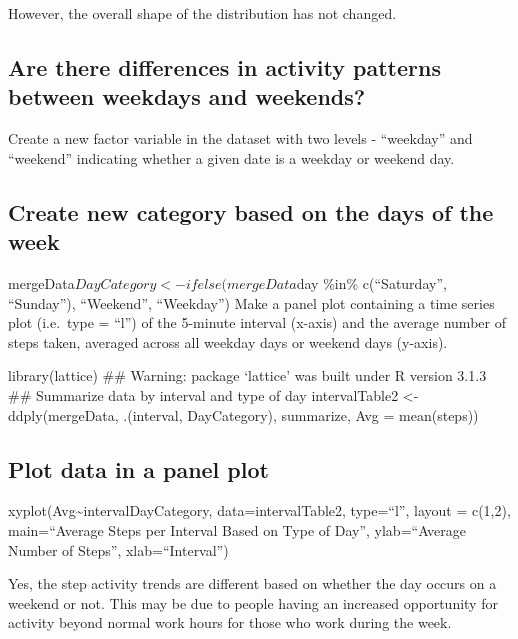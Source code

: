 \documentclass[]{article}
\begin{document}
However, the overall shape of the distribution has not changed.

\subsection{Are there differences in activity patterns between weekdays
and
weekends?}\label{are-there-differences-in-activity-patterns-between-weekdays-and-weekends}

Create a new factor variable in the dataset with two levels -
``weekday'' and ``weekend'' indicating whether a given date is a weekday
or weekend day.

\subsection{Create new category based on the days of the
week}\label{create-new-category-based-on-the-days-of-the-week}

mergeData\(DayCategory <- ifelse(mergeData\)day \%in\% c(``Saturday'',
``Sunday''), ``Weekend'', ``Weekday'') Make a panel plot containing a
time series plot (i.e.~type = ``l'') of the 5-minute interval (x-axis)
and the average number of steps taken, averaged across all weekday days
or weekend days (y-axis).

library(lattice) \#\# Warning: package `lattice' was built under R
version 3.1.3 \#\# Summarize data by interval and type of day
intervalTable2 \textless{}- ddply(mergeData, .(interval, DayCategory),
summarize, Avg = mean(steps))

\subsection{Plot data in a panel plot}\label{plot-data-in-a-panel-plot}

xyplot(Avg\textasciitilde{}interval\textbar{}DayCategory,
data=intervalTable2, type=``l'', layout = c(1,2), main=``Average Steps
per Interval Based on Type of Day'', ylab=``Average Number of Steps'',
xlab=``Interval'')

Yes, the step activity trends are different based on whether the day
occurs on a weekend or not. This may be due to people having an
increased opportunity for activity beyond normal work hours for those
who work during the week.
\end{document}
